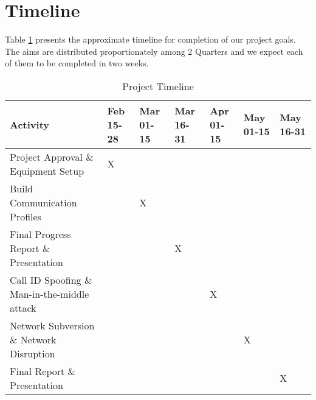 \section{Timeline}

Table \ref{schedule} presents the approximate timeline for completion of our project goals. The aims are distributed proportionately among 2 Quarters and we expect each of them to be completed in two weeks.


\begin{table}[htb]
\centering
\caption{Project Timeline}
\label{schedule}
\begin{tabular}{|m{2cm}|m{0.5cm}|m{0.5cm}|m{0.5cm}|m{0.5cm}|m{0.5cm}|m{0.5cm}|}
\hline
\textbf{Activity} & Feb 15-28 & Mar 01-15 & Mar 16-31 & Apr 01-15 & May 01-15 & May 16-31\\
\hline
Project Approval \& Equipment Setup & X & & & & & \\
\hline
Build Communication Profiles & & X & & & & \\
\hline
Final Progress Report \& Presentation & & & X & & &  \\
\hline
Call ID Spoofing \& Man-in-the-middle attack & & & & X & &\\
\hline
Network Subversion \& Network Disruption & & & & & X &\\
\hline
Final Report \& Presentation & & & & & & X\\
\hline
\end{tabular}
\end{table}



 



